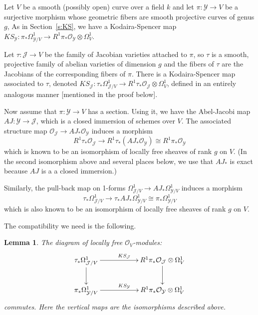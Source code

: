 \documentclass[reqno]{amsart}
\newtheorem{lemma}[thm]{Lemma}
\theoremstyle{definition}
\theoremstyle{remark}
\def\JJ{\mathcal{J}}
\def\YY{\mathcal{Y}}
\def\OO{\mathcal{O}}
\def\tensor{\otimes}
\begin{document}
Let $V$ be a smooth (possibly open) curve over a field $k$ and let
$\pi:\YY\to V$ be a surjective morphism whose geometric fibers are smooth
projective curves of genus $g$,  As in Section~\ref{s:KS}, we have a
Kodaira-Spencer map $KS_\YY:\pi_*\Omega^1_{\YY/V}\to
R^1\pi_*\OO_{\YY}\tensor\Omega^1_V$.

Let $\tau:\JJ\to V$ be the family of Jacobian varieties attached to
$\pi$, so $\tau$ is a smooth, projective family of abelian varieties
of dimension $g$ and the fibers of $\tau$ are the Jacobians of the
corresponding fibers of $\pi$.  There is a Kodaira-Spencer map
associated to $\tau$, denoted $KS_\JJ:\tau_*\Omega^1_{\JJ/V}\to
R^1\tau_*\OO_{\JJ}\tensor\Omega^1_V$, defined in an entirely analogous
manner [mentioned in the proof below].

Now assume that $\pi:\YY\to V$ has a section.  Using it, we have the
Abel-Jacobi map $AJ:\YY\to\JJ$, which is a closed immersion of schemes
over $V$.  The associated structure map $\OO_\JJ\to AJ_*\OO_{\YY}$
induces a morphism
$$R^1\tau_*\OO_{\JJ}\to R^1\tau_*\left(AJ_*\OO_\YY\right)
\cong R^1\pi_*\OO_\YY$$ which is known to be an isomorphism of locally
free sheaves of rank $g$ on $V$. (In the second isomorphism above and
several places below, we use that $AJ_*$ is exact because $AJ$ is a a
closed immersion.)

Similarly, the pull-back map on 1-forms $\Omega^1_{\JJ/V}\to
AJ_*\Omega^1_{\YY/V}$ induces a morphism
$$\tau_*\Omega^1_{\JJ/V}\to
\tau_*AJ_*\Omega^1_{\YY/V}\cong\pi_*\Omega^1_{\YY/V}$$
which is also known to be an isomorphism of locally free sheaves of rank
$g$ on $V$.

The compatibility we need is the following.

\begin{lemma}\label{lemma:KS-comp}
The diagram of locally free $\OO_V$-modules:
$$\xymatrix{
\tau_*\Omega^1_{\JJ/V}\ar[rr]^{KS_\JJ}\ar[d]&&R^1\pi_*\OO_{\JJ}\tensor\Omega^1_V\ar[d]\\
\pi_*\Omega^1_{\YY/V}\ar[rr]^{KS_\YY}&&R^1\pi_*\OO_{\YY}\tensor\Omega^1_V
}$$
commutes.  Here the vertical maps are the isomorphisms described above.
\end{lemma}
\end{document}
